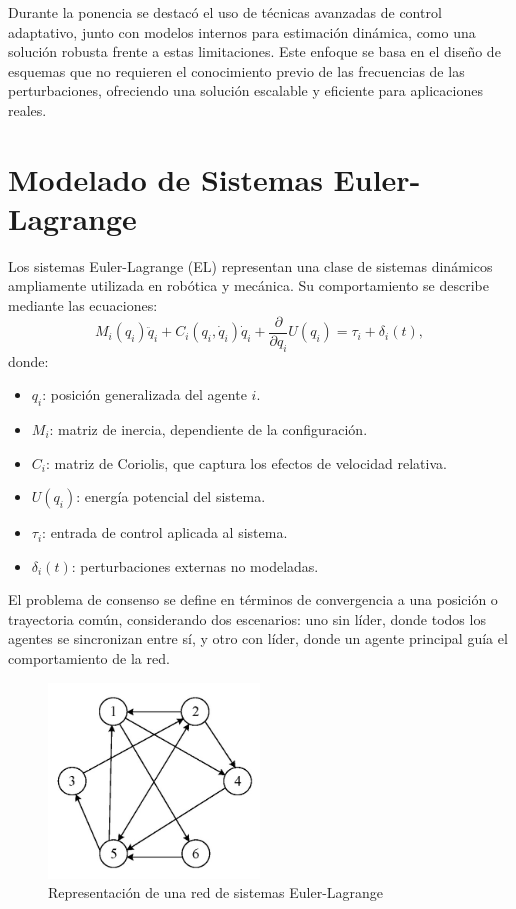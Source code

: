 \documentclass[conference]{IEEEtran}
\begin{document}
Durante la ponencia se destacó el uso de técnicas avanzadas de control adaptativo, junto con modelos internos para estimación dinámica, como una solución robusta frente a estas limitaciones. Este enfoque se basa en el diseño de esquemas que no requieren el conocimiento previo de las frecuencias de las perturbaciones, ofreciendo una solución escalable y eficiente para aplicaciones reales.

\section*{Modelado de Sistemas Euler-Lagrange}

Los sistemas Euler-Lagrange (EL) representan una clase de sistemas dinámicos ampliamente utilizada en robótica y mecánica. Su comportamiento se describe mediante las ecuaciones:
\[
M_i(q_i)\ddot{q}_i + C_i(q_i, \dot{q}_i)\dot{q}_i + \frac{\partial}{\partial q_i} U(q_i) = \tau_i + \delta_i(t),
\]
donde:
\begin{itemize}
    \item \( q_i \): posición generalizada del agente \( i \).
    \item \( M_i \): matriz de inercia, dependiente de la configuración.
    \item \( C_i \): matriz de Coriolis, que captura los efectos de velocidad relativa.
    \item \( U(q_i) \): energía potencial del sistema.
    \item \( \tau_i \): entrada de control aplicada al sistema.
    \item \( \delta_i(t) \): perturbaciones externas no modeladas.
\end{itemize}

El problema de consenso se define en términos de convergencia a una posición o trayectoria común, considerando dos escenarios: uno sin líder, donde todos los agentes se sincronizan entre sí, y otro con líder, donde un agente principal guía el comportamiento de la red.

\begin{figure}[h!]
    \centering
    \includegraphics[width=0.5\textwidth]{network.jpg}
    \caption{Representación de una red de sistemas Euler-Lagrange}
\end{figure}
\end{document}
